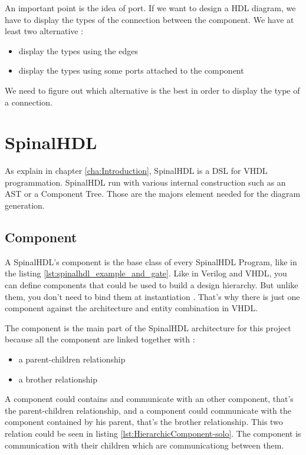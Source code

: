 An important point is the idea of port. If we want to design a HDL diagram, we
have to display the types of the connection between the component. We have at
least two alternative :
\begin{itemize}
 \item display the types using the edges
 \item display the types using some ports attached to the component
\end{itemize}

We need to figure out which alternative is the best in order to display the type
of a connection.

\section{SpinalHDL}
\label{sec:SpinalHDL}

As explain in chapter \ref{cha:Introduction}, SpinalHDL is a DSL for VHDL
programmation. SpinalHDL run with various internal construction such as an AST
or a Component Tree. Those are the majors element needed for the diagram
generation.

\subsection{Component}
\label{sub:Component}

A SpinalHDL's component is the base class of every SpinalHDL Program, like in
the listing \ref{lst:spinalhdl_example_and_gate}. Like in Verilog and VHDL, you
can define components that could be used to build a design hierarchy. But unlike
them, you don’t need to bind them at instantiation \cite{github-spinalhdl}.
That's why there is just one component against the architecture and entity
combination in VHDL.

The component is the main part of the SpinalHDL architecture for this project
because all the component are linked together with :
\begin{itemize}
    \item a parent-children relationship
    \item a brother relationship
\end{itemize}

A component could contains and communicate with an other component, that's the
parent-children relationship, and a component could communicate with the
component contained by his parent, that's the brother relationship. This two
relation could be seen in listing \ref{lst:HierarchicComponent-solo}. The
component is communication with their children which are communicationg between
them.

